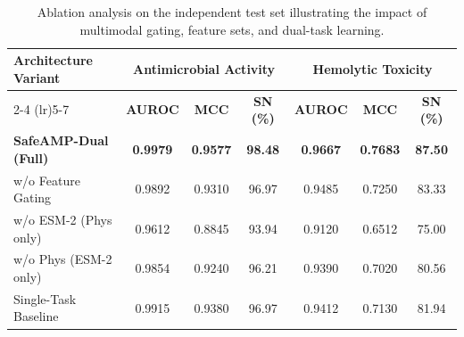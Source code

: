 \documentclass[11pt,a4paper]{article}
\begin{document}
\begin{table}[htbp]
\centering
\caption{Ablation analysis on the independent test set illustrating the impact of multimodal gating, feature sets, and dual-task learning.}
\label{tab:ablation}
\small
\begin{tabular*}{\textwidth}{@{\extracolsep{\fill}}lcccccc@{}}
\toprule
\multirow{2}{*}{\textbf{Architecture Variant}} & \multicolumn{3}{c}{\textbf{Antimicrobial Activity}} & \multicolumn{3}{c}{\textbf{Hemolytic Toxicity}} \\
\cmidrule(lr){2-4} \cmidrule(lr){5-7}
& \textbf{AUROC} & \textbf{MCC} & \textbf{SN (\%)} & \textbf{AUROC} & \textbf{MCC} & \textbf{SN (\%)} \\
\midrule
\textbf{SafeAMP-Dual (Full)} & \textbf{0.9979} & \textbf{0.9577} & \textbf{98.48} & \textbf{0.9667} & \textbf{0.7683} & \textbf{87.50} \\
w/o Feature Gating & 0.9892 & 0.9310 & 96.97 & 0.9485 & 0.7250 & 83.33 \\
w/o ESM-2 (Phys only) & 0.9612 & 0.8845 & 93.94 & 0.9120 & 0.6512 & 75.00 \\
w/o Phys (ESM-2 only) & 0.9854 & 0.9240 & 96.21 & 0.9390 & 0.7020 & 80.56 \\
Single-Task Baseline & 0.9915 & 0.9380 & 96.97 & 0.9412 & 0.7130 & 81.94 \\
\bottomrule
\end{tabular*}
\end{table}
\end{document}
